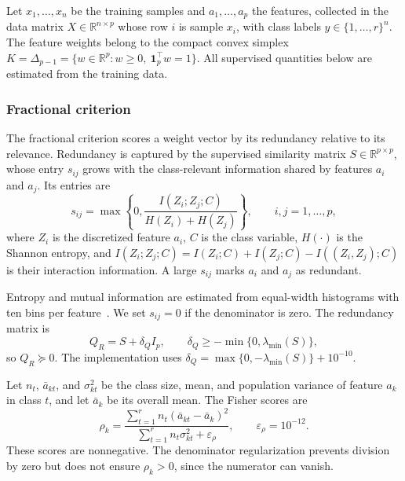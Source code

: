 \documentclass[]{interact}
\theoremstyle{plain}
\theoremstyle{definition}
\theoremstyle{remark}
\newcommand{\R}{\mathbb{R}}
\begin{document}
Let $x_1,\ldots,x_n$ be the training samples and $a_1,\ldots,a_p$ the features, collected in the data matrix $X\in\R^{n\times p}$ whose row $i$ is sample $x_i$, with class labels $y\in\{1,\ldots,r\}^n$. The feature weights belong to the compact convex simplex $K=\Delta_{p-1}=\{w\in\R^p:w\ge0,\ \mathbf1_p^{\top}w=1\}$. All supervised quantities below are estimated from the training data.

\subsubsection{Fractional criterion}\label{ssec:wang}\label{sssec:wang-inputs}\label{sssec:nfscore}
The fractional criterion scores a weight vector by its redundancy relative to its relevance. Redundancy is captured by the supervised similarity matrix $S\in\R^{p\times p}$, whose entry $s_{ij}$ grows with the class-relevant information shared by features $a_i$ and $a_j$. Its entries are
\begin{equation}\label{eq:simMI}
s_{ij}=\max\left\{0,\frac{I(Z_i;Z_j;C)}{H(Z_i)+H(Z_j)}\right\},\qquad i,j=1,\ldots,p,
\end{equation}
where $Z_i$ is the discretized feature $a_i$, $C$ is the class variable, $H(\cdot)$ is the Shannon entropy, and $I(Z_i;Z_j;C)=I(Z_i;C)+I(Z_j;C)-I((Z_i,Z_j);C)$ is their interaction information. A large $s_{ij}$ marks $a_i$ and $a_j$ as redundant.

Entropy and mutual information are estimated from equal-width histograms with ten bins per feature~\citep{brown2012}. We set $s_{ij}=0$ if the denominator is zero. The redundancy matrix is
\begin{equation}\label{eq:matrixQ}
Q_R=S+\delta_QI_p,\qquad \delta_Q\ge-\min\{0,\lambda_{\min}(S)\},
\end{equation}
so $Q_R\succeq0$. The implementation uses $\delta_Q=\max\{0,-\lambda_{\min}(S)\}+10^{-10}$.

Let $n_t$, $\bar a_{kt}$, and $\sigma_{kt}^2$ be the class size, mean, and population variance of feature $a_k$ in class $t$, and let $\bar a_k$ be its overall mean. The Fisher scores are
\begin{equation}\label{eq:rhoFisher}
\rho_k=\frac{\sum_{t=1}^r n_t(\bar a_{kt}-\bar a_k)^2}{\sum_{t=1}^r n_t\sigma_{kt}^2+\varepsilon_\rho},\qquad \varepsilon_\rho=10^{-12}.
\end{equation}
These scores are nonnegative. The denominator regularization prevents division by zero but does not ensure $\rho_k>0$, since the numerator can vanish.
\end{document}
